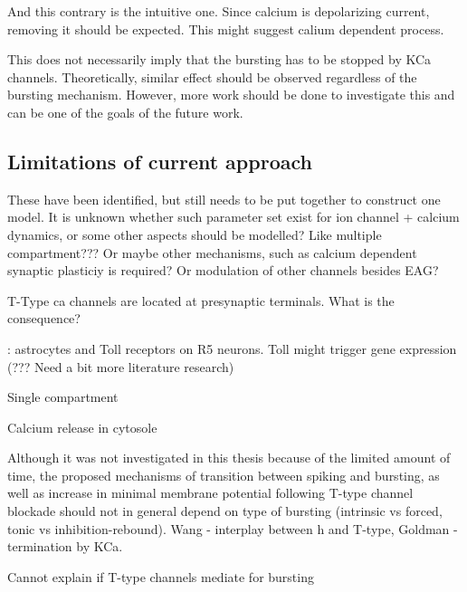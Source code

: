 \documentclass[../main.tex]{subfiles}
\begin{document}
And this contrary is the intuitive one. Since calcium is depolarizing current, removing it should be expected. This might suggest calium dependent process.

This does not necessarily imply that the bursting has to be stopped by KCa channels. Theoretically, similar effect should be observed regardless of the bursting mechanism. However, more work should be done to investigate this and can be one of the goals of the future work.

\color{black}



\subsection{Limitations of current approach}

These have been identified, but still needs to be put together to construct one model. It is unknown whether such parameter set exist for ion channel + calcium dynamics, or some other aspects should be modelled? Like multiple compartment??? Or maybe other mechanisms, such as calcium dependent synaptic plasticiy is required? Or modulation of other channels besides EAG?

T-Type ca channels are located at presynaptic terminals. What is the consequence?

\parencite{blumAstroglialCalciumSignaling2021}: astrocytes and Toll receptors on R5 neurons.
    Toll might trigger gene expression (??? Need a bit more literature research)

Single compartment

Calcium release in cytosole

Although it was not investigated in this thesis because of the limited amount of time, the proposed mechanisms of transition between spiking and bursting, as well as increase in minimal membrane potential following T-type channel blockade should not in general depend on type of bursting (intrinsic vs forced, tonic vs inhibition-rebound).
Wang - interplay between h and T-type, Goldman - termination by KCa.

Cannot explain if T-type channels mediate for bursting

\end{document}
